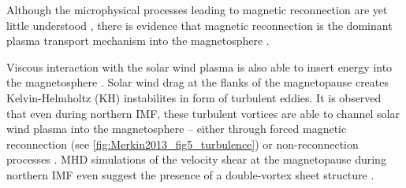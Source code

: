 Although the microphysical processes leading to magnetic reconnection are yet little understood \citep{Phan2005}, there is evidence that magnetic reconnection is the dominant plasma transport mechanism into the magnetosphere \citep{DeKeyser2005}.

Viscous interaction with the solar wind plasma is also able to insert energy into the magnetosphere \citep{Alfven1942}. Solar wind drag at the flanks of the magnetopause creates Kelvin-Helmholtz (KH) instabilites in form of turbulent eddies. It is observed that even during northern IMF, these turbulent vortices are able to channel solar wind plasma into the magnetosphere -- either through forced magnetic reconnection (see \autoref{fig:Merkin2013_fig5_turbulence}) or non-reconnection processes \citep{Otto2003,Phan2005}. MHD simulations of the velocity shear at the magnetopause during northern IMF even suggest the presence of a double-vortex sheet structure \citep{Merkin2013}.
\begin{figure}[htb]
\end{figure}


